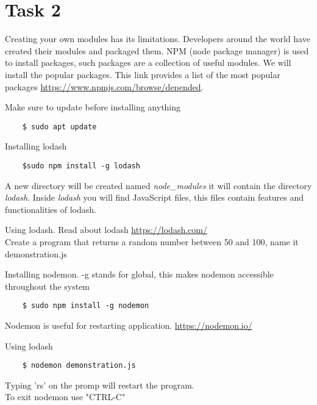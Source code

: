 \documentclass[12pt]{article}
\begin{document}
\section*{Task 2} 
Creating your own modules has its limitations. Developers around the world have created their modules and packaged them. NPM (node package manager) is used to install packages, such packages are a collection of useful modules. We will install the popular packages. This link provides a list of the most popular packages \href{https://www.npmjs.com/browse/depended}{https://www.npmjs.com/browse/depended}.
\begin{todolist}
    \item Make sure to update before installing anything 
    \begin{lstlisting}
    $ sudo apt update
    \end{lstlisting}
    \item Installing lodash 
    \begin{lstlisting}
    $sudo npm install -g lodash
    \end{lstlisting}
    A new directory will be created named \textit{node\_modules} it will contain the directory \textit{lodash}. Inside \textit{lodash} you will find JavaScript files, this files contain features and functionalities of lodash. 
    \item Using lodash. Read about lodash \href{https://lodash.com/}{https://lodash.com/}\\
    Create a program that returns a random number between 50 and 100, name it demonstration.js 
    
    \item Installing nodemon. -g stands for global, this makes nodemon accessible throughout the system 
    \begin{lstlisting}
    $ sudo npm install -g nodemon 
    \end{lstlisting}
    Nodemon is useful for restarting application. \href{https://nodemon.io/}{https://nodemon.io/}
    \item Using lodash \\
    \begin{lstlisting}
    $ nodemon demonstration.js
    \end{lstlisting}
    Typing 'rs' on the promp will restart the program.\\
    To exit nodemon use "CTRL-C" 
\end{todolist}
\end{document}
